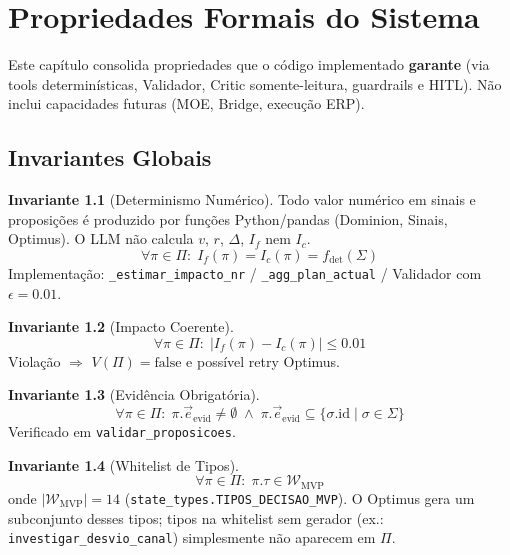 \documentclass[a4paper, 12pt]{report}
\theoremstyle{definition}
\newtheorem{invariante}{Invariante}[chapter]
\theoremstyle{remark}
\begin{document}
\chapter{Propriedades Formais do Sistema}

Este cap\'itulo consolida propriedades que o c\'odigo implementado
\textbf{garante} (via tools determin\'isticas, Validador, Critic
somente-leitura, guardrails e HITL). N\~ao inclui capacidades futuras
(MOE, Bridge, execu\c{c}\~ao ERP).


\section{Invariantes Globais}

\begin{invariante}[Determinismo Num\'erico]
  Todo valor num\'erico em sinais e proposi\c{c}\~oes \'e produzido por
  fun\c{c}\~oes Python/pandas (Dominion, Sinais, Optimus). O LLM n\~ao
  calcula $v$, $r$, $\Delta$, $I_f$ nem $I_c$.
  \[
    \forall \pi \in \Pi :\;
    I_f(\pi) = I_c(\pi) = f_{\text{det}}(\Sigma)
  \]
  Implementa\c{c}\~ao: \texttt{\_estimar\_impacto\_nr} /
  \texttt{\_agg\_plan\_actual} / Validador com $\epsilon = 0.01$.
\end{invariante}

\begin{invariante}[Impacto Coerente]
  \[
    \forall \pi \in \Pi :\; |I_f(\pi) - I_c(\pi)| \leq 0.01
  \]
  Viola\c{c}\~ao $\Rightarrow$ $V(\Pi)=\text{false}$ e poss\'ivel retry Optimus.
\end{invariante}

\begin{invariante}[Evid\^encia Obrigat\'oria]
  \[
    \forall \pi \in \Pi :\;
    \pi.\vec{e}_{\text{evid}} \neq \emptyset
    \;\land\;
    \pi.\vec{e}_{\text{evid}} \subseteq \{\sigma.\text{id} \mid \sigma \in \Sigma\}
  \]
  Verificado em \texttt{validar\_proposicoes}.
\end{invariante}

\begin{invariante}[Whitelist de Tipos]
  \[
    \forall \pi \in \Pi :\; \pi.\tau \in \mathcal{W}_{\text{MVP}}
  \]
  onde $|\mathcal{W}_{\text{MVP}}| = 14$
  (\texttt{state\_types.TIPOS\_DECISAO\_MVP}).
  O Optimus gera um subconjunto desses tipos; tipos na whitelist
  sem gerador (ex.: \texttt{investigar\_desvio\_canal}) simplesmente
  n\~ao aparecem em $\Pi$.
\end{invariante}
\end{document}
